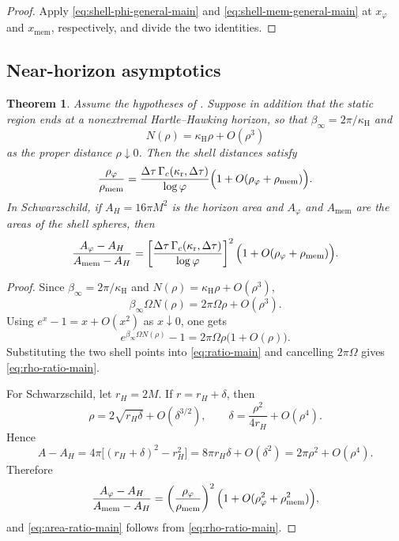 \documentclass[11pt]{amsart}
\numberwithin{equation}{section}
\newtheorem{theorem}{Theorem}[section]
\theoremstyle{remark}
\begin{document}
\begin{proof}
Apply \eqref{eq:shell-phi-general-main} and \eqref{eq:shell-mem-general-main} at $x_{\varphi}$ and $x_{\mathrm{mem}}$, respectively, and divide the two identities.
\end{proof}

\subsection{Near-horizon asymptotics}

\begin{theorem}\label{thm:horizon-main}
Assume the hypotheses of . Suppose in addition that the static region ends at a nonextremal Hartle--Hawking horizon, so that $\beta_\infty=2\pi/\kappa_{\mathrm H}$ and
\begin{equation}\label{eq:horizon-main}
N(\rho)=\kappa_{\mathrm H}\rho+O(\rho^3)
\end{equation}
as the proper distance $\rho\downarrow0$. Then the shell distances satisfy
\begin{equation}\label{eq:rho-ratio-main}
\frac{\rho_{\varphi}}{\rho_{\mathrm{mem}}}
=
\frac{\Delta\tau\,\Gamma_c(\kappa_{\mathrm r},\Delta\tau)}{\log\varphi}
\Bigl(1+O(\rho_{\varphi}+\rho_{\mathrm{mem}})\Bigr).
\end{equation}
In Schwarzschild, if $A_H=16\pi M^2$ is the horizon area and $A_{\varphi}$ and $A_{\mathrm{mem}}$ are the areas of the shell spheres, then
\begin{equation}\label{eq:area-ratio-main}
\frac{A_{\varphi}-A_H}{A_{\mathrm{mem}}-A_H}
=
\left[
\frac{\Delta\tau\,\Gamma_c(\kappa_{\mathrm r},\Delta\tau)}{\log\varphi}
\right]^2
\Bigl(1+O(\rho_{\varphi}+\rho_{\mathrm{mem}})\Bigr).
\end{equation}
\end{theorem}

\begin{proof}
Since $\beta_\infty=2\pi/\kappa_{\mathrm H}$ and $N(\rho)=\kappa_{\mathrm H}\rho+O(\rho^3)$,
\[
\beta_\infty\Omega N(\rho)=2\pi\Omega\rho+O(\rho^3).
\]
Using $e^x-1=x+O(x^2)$ as $x\downarrow0$, one gets
\[
e^{\beta_\infty\Omega N(\rho)}-1=2\pi\Omega\rho\bigl(1+O(\rho)\bigr).
\]
Substituting the two shell points into \eqref{eq:ratio-main} and cancelling $2\pi\Omega$ gives \eqref{eq:rho-ratio-main}.

For Schwarzschild, let $r_H=2M$. If $r=r_H+\delta$, then
\[
\rho=2\sqrt{r_H\delta}+O(\delta^{3/2}),
\qquad
\delta=\frac{\rho^2}{4r_H}+O(\rho^4).
\]
Hence
\[
A-A_H
=4\pi\bigl[(r_H+\delta)^2-r_H^2\bigr]
=8\pi r_H\delta+O(\delta^2)
=2\pi\rho^2+O(\rho^4).
\]
Therefore
\[
\frac{A_{\varphi}-A_H}{A_{\mathrm{mem}}-A_H}
=
\left(\frac{\rho_{\varphi}}{\rho_{\mathrm{mem}}}\right)^2
\Bigl(1+O(\rho_{\varphi}^2+\rho_{\mathrm{mem}}^2)\Bigr),
\]
and \eqref{eq:area-ratio-main} follows from \eqref{eq:rho-ratio-main}.
\end{proof}
\end{document}
